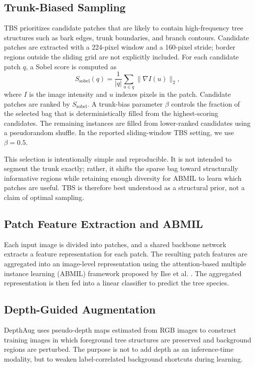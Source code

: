 \documentclass{ieeeaccess}
\begin{document}
\subsection{Trunk-Biased Sampling}
TBS prioritizes candidate patches that are likely to contain high-frequency tree structures such as
bark edges, trunk boundaries, and branch contours. Candidate patches are extracted with a 224-pixel
window and a 160-pixel stride; border regions outside the sliding grid are not explicitly included.
For each candidate patch $q$, a Sobel score is computed as
\begin{equation}
S_{\mathrm{sobel}}(q)=\frac{1}{|q|}\sum_{u \in q}\|\nabla I(u)\|_2,
\label{eq:sobel}
\end{equation}
where $I$ is the image intensity and $u$ indexes pixels in the patch. Candidate patches are ranked
by $S_{\mathrm{sobel}}$. A trunk-bias parameter $\beta$ controls the fraction of the selected bag
that is deterministically filled from the highest-scoring candidates. The remaining instances are
filled from lower-ranked candidates using a pseudorandom shuffle. In the reported sliding-window
TBS setting, we use $\beta=0.5$.

This selection is intentionally simple and reproducible. It is not intended to segment the trunk
exactly; rather, it shifts the sparse bag toward structurally informative regions while retaining
enough diversity for ABMIL to learn which patches are useful. TBS is therefore best understood as a
structural prior, not a claim of optimal sampling.

\subsection{Patch Feature Extraction and ABMIL}
Each input image is divided into patches, and a shared backbone network extracts a feature
representation for each patch. The resulting patch features are aggregated into an image-level
representation using the attention-based multiple instance learning (ABMIL) framework proposed
by Ilse et al. \cite{abmil}. The aggregated representation is then fed into a linear classifier to predict the tree species.

\subsection{Depth-Guided Augmentation}
DepthAug uses pseudo-depth maps estimated from RGB images to construct training images in which
foreground tree structures are preserved and background regions are perturbed. The purpose is not to
add depth as an inference-time modality, but to weaken label-correlated background shortcuts during
learning.
\end{document}
